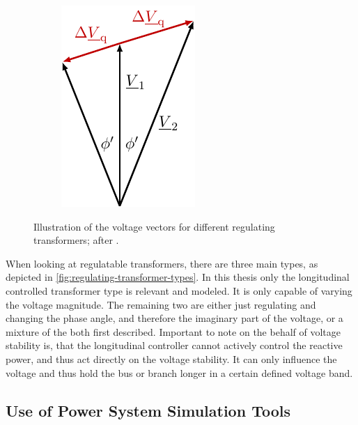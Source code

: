 \begin{figure}[htb!]
\begin{subfigure}[b]{0.29\linewidth}
        \end{subfigure}
        \begin{subfigure}[b]{0.29\linewidth}
            \centering
            \includegraphics{tikz_graphics/images/vectors_cross_regulator.pdf}
        \end{subfigure}
        \caption[Illustration of the voltage vectors for different regulating transformers]{Illustration of the voltage vectors for different regulating transformers; after \autocite{schwab_2022}.}
        \label{fig:regulating-transformer-types}
\end{figure}

When looking at regulatable transformers, there are three main types, as depicted in \autoref{fig:regulating-transformer-types}.
In this thesis only the longitudinal controlled transformer type is relevant and modeled. 
It is only capable of varying the voltage magnitude.
The remaining two are either just regulating and changing the phase angle, and therefore the imaginary part of the voltage, or a mixture of the both first described.
Important to note on the behalf of voltage stability is, that the longitudinal controller cannot actively control the reactive power, and thus act directly on the voltage stability.
It can only influence the voltage and thus hold the bus or branch longer in a certain defined voltage band.

\subsection{Use of Power System Simulation Tools}
\label{sec:simulation-tools}

